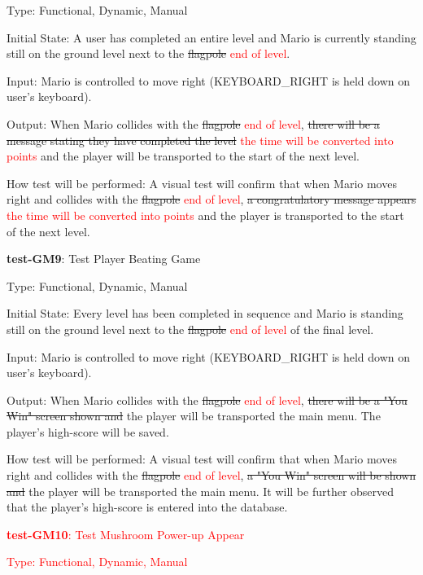 \documentclass[12pt, titlepage]{article}
\begin{document}
\begin{enumerate}
Type: Functional, Dynamic, Manual

Initial State: A user has completed an entire level and Mario is currently standing still on the ground level next to the \sout{flagpole} \textcolor{red}{end of level}.

Input: Mario is controlled to move right (KEYBOARD\_RIGHT is held down on user's keyboard).

Output: When Mario collides with the \sout{flagpole} \textcolor{red}{end of level}, \sout{there will be a message stating they have completed the level} \textcolor{red}{the time will be converted into points} and the player will be transported to the start of the next level.

How test will be performed: A visual test will confirm that when Mario moves right and collides with the \sout{flagpole} \textcolor{red}{end of level}, \sout{a congratulatory message appears} \textcolor{red}{the time will be converted into points} and the player is transported to the start of the next level.

\item{\textbf{test-GM9}: Test Player Beating Game\\}

Type: Functional, Dynamic, Manual

Initial State: Every level has been completed in sequence and Mario is standing still on the ground level next to the \sout{flagpole} \textcolor{red}{end of level} of the final level.

Input: Mario is controlled to move right (KEYBOARD\_RIGHT is held down on user's keyboard).

Output: When Mario collides with the \sout{flagpole} \textcolor{red}{end of level}, \sout{there will be a "You Win" screen shown and} the player will be transported the main menu. The player's high-score will be saved.

How test will be performed: A visual test will confirm that when Mario moves right and collides with the \sout{flagpole} \textcolor{red}{end of level}, \sout{a "You Win" screen will be shown and} the player will be transported the main menu. It will be further observed that the player's high-score is entered into the database.

\textcolor{red}{\item{\textbf{test-GM10}: Test Mushroom Power-up Appear\\}}

\textcolor{red}{Type: Functional, Dynamic, Manual}


\end{enumerate}
\end{document}
